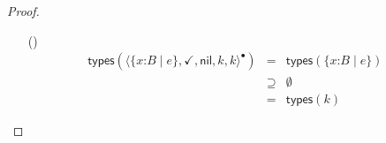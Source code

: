 \documentclass[9pt]{extarticle}
\newcommand{\ottnt}[1]{\mathit{#1}}
\begin{document}
\begin{lemma}
\begin{proof}
{\begin{itemize}
\[\begin{array}{rclr}
        &\supseteq&     \mathsf{types} (  \{ \mathit{x} \mathord{:} \ottnt{B} \mathrel{\mid} \ottnt{e} \}  )   \cup   \mathsf{types} ( \ottnt{r} )    \cup   \mathsf{types} ( \ottnt{e''} )   & \text{(IH)} \\
        &=&  \mathsf{types} (  \langle   \{ \mathit{x} \mathord{:} \ottnt{B} \mathrel{\mid} \ottnt{e} \}  ,  \ottnt{s} ,  \ottnt{r} ,  \ottnt{k} ,  \ottnt{e''}  \rangle^{\bullet}  )  &
      \end{array} \]
    \item[(\E{StackRaise})] \[ \begin{array}{rclr}
         \mathsf{types} (  \langle   \{ \mathit{x} \mathord{:} \ottnt{B} \mathrel{\mid} \ottnt{e} \}  ,   \mathord{\checkmark}  ,  \mathsf{nil} ,  \ottnt{k} ,  \ottnt{k}  \rangle^{\bullet}  )  &=&  \mathsf{types} (  \{ \mathit{x} \mathord{:} \ottnt{B} \mathrel{\mid} \ottnt{e} \}  )  & \\
        &\supseteq&  \emptyset  & \\
        &=&  \mathsf{types} ( \ottnt{k} )  &
      \end{array} \]
    \end{itemize} 
    \fi}
  \end{proof}
\end{lemma}
\end{document}
